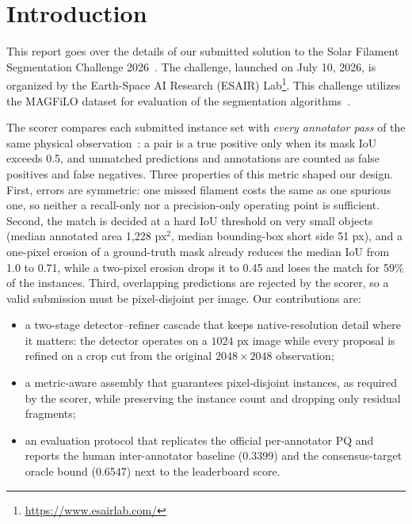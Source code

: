 \documentclass[sigconf]{acmart}
\begin{document}
\maketitle

\section{Introduction}
This report goes over the details of our submitted solution to the Solar Filament Segmentation Challenge 2026~\cite{challenge2026}.
The challenge, launched on July 10, 2026, is organized by the Earth-Space AI Research (ESAIR) Lab\footnote{\url{https://www.esairlab.com/}}.
This challenge utilizes the MAGFiLO dataset for evaluation of the segmentation algorithms~\cite{magfilo2024}.

The scorer compares each submitted instance set with \emph{every annotator pass} of the same physical observation~\cite{kirillov2019}: a pair is a true positive only when its mask IoU exceeds 0.5, and unmatched predictions and annotations are counted as false positives and false negatives.
Three properties of this metric shaped our design.
First, errors are symmetric: one missed filament costs the same as one spurious one, so neither a recall-only nor a precision-only operating point is sufficient.
Second, the match is decided at a hard IoU threshold on very small objects (median annotated area 1{,}228 px$^2$, median bounding-box short side 51 px), and a one-pixel erosion of a ground-truth mask already reduces the median IoU from 1.0 to 0.71, while a two-pixel erosion drops it to 0.45 and loses the match for 59\% of the instances.
Third, overlapping predictions are rejected by the scorer, so a valid submission must be pixel-disjoint per image.
Our contributions are:
\begin{itemize}
  \item a two-stage detector--refiner cascade that keeps native-resolution detail where it matters: the detector operates on a $1024$ px image while every proposal is refined on a crop cut from the original $2048\times2048$ observation;
  \item a metric-aware assembly that guarantees pixel-disjoint instances, as required by the scorer, while preserving the instance count and dropping only residual fragments;
  \item an evaluation protocol that replicates the official per-annotator PQ and reports the human inter-annotator baseline (0.3399) and the consensus-target oracle bound (0.6547) next to the leaderboard score.
\end{itemize}
\end{document}
